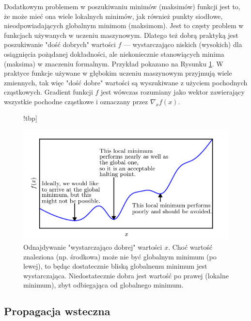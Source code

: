 \documentclass[12pt,a4paper,leqno,oneside,titlepage]{book}
\begin{document}
Dodatkowym problemem w poszukiwaniu minimów (maksimów) funkcji jest to, że może mieć ona wiele lokalnych minimów, jak również punkty siodłowe, nieodpowiadających globalnym minimom (maksimom). Jest to częsty problem w funkcjach używanych w uczeniu maszynowym. Dlatego też dobrą praktyką jest poszukiwanie "dość dobrych" wartości $f$ — wystarczająco niskich (wysokich) dla osiągnięcia pożądanej dokładności, ale niekoniecznie stanowiących minima (maksima) w znaczeniu formalnym. Przykład pokazano na Rysunku \ref{fig:approximate_minimization}. W praktyce funkcje używane w głębokim uczeniu maszynowym przyjmują wiele zmiennych, tak więc "dość dobre" wartości są wyszukiwane z użyciem pochodnych cząstkowych. Gradient funkcji $f$ jest wówczas rozumiany jako wektor zawierający wszystkie pochodne cząstkowe i oznaczany przez $\nabla_{x}f(x)$.\cite{Goodfellow-et-al-2016}


\begin{figure}!tbp]
  \centering
  \begin{minipage}[b]{0.5\textheight}
    \includegraphics[width=\textwidth]{pictures/approximate_minimization.png}
  \end{minipage}
  \caption{Odnajdywanie "wystarczająco dobrej" wartości $x$. Choć wartość znaleziona (np. środkowa) może nie być globalnym minimum (po lewej), to będąc dostatecznie bliską globalnemu minimum jest wystarczająca. Niedostatecznie dobra jest wartość po prawej (lokalne minimum), zbyt odbiegająca od globalnego minimum.\cite{Goodfellow-et-al-2016}}
  \label{fig:approximate_minimization}
\end{figure}

\subsection{Propagacja wsteczna}

%
%
%
%
%
%
%
%
%
%
\end{document}

